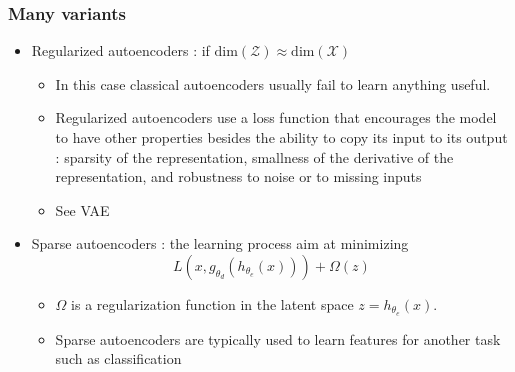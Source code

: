 \documentclass[french,9pt]{beamer}
\begin{document}
\begin{frame}
\frametitle{Many variants}

\begin{itemize}
\item Regularized autoencoders :  if $\text{dim}(\mathcal{Z})\approx \text{dim}(\mathcal{X})$ 
\begin{itemize}
\item In this case classical autoencoders usually fail to learn anything useful.
\item Regularized autoencoders  use a loss function that encourages the model to have other properties besides the ability to copy its input to its output : sparsity of the representation, smallness of the derivative of the representation, and robustness to noise or to missing inputs
\item See VAE
\end{itemize}
\item Sparse autoencoders :  the learning process aim at minimizing $$L(x,g_{\theta_{d}}(h_{\theta_{e}}(x))) + \Omega(z)$$
\begin{itemize}
\item $ \Omega$ is a regularization function in the latent space $z=h_{\theta_{e}}(x)$.
\item  Sparse autoencoders are typically used to learn features for another task such as classification
\end{itemize}
\end{itemize}


\end{frame}
\end{document}
